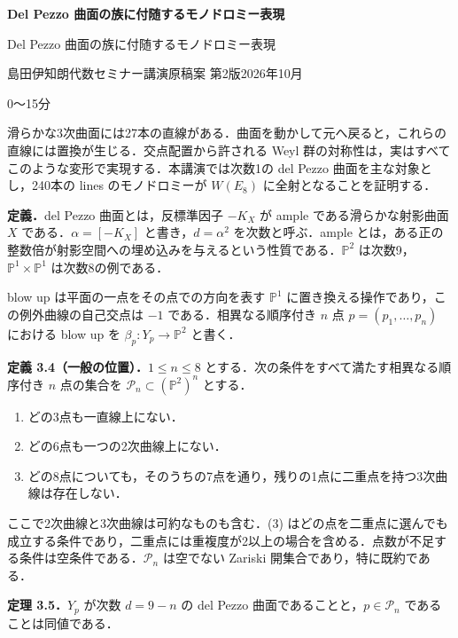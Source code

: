 \documentclass[a4paper,10pt]{ltjsarticle}
\newcommand{\PP}{\mathbb P}
\newcommand{\CC}{\mathbb C}
\newcommand{\Pn}{\mathcal P}
\newcommand{\head}[2]{\par\medskip\noindent{\large\bfseries #1}\hfill{\small #2}\par\medskip}
\begin{document}
\begin{center}
{\Large\bfseries Del Pezzo 曲面の族に付随するモノドロミー表現}\par\smallskip
{\large Del Pezzo 曲面の族に付随するモノドロミー表現}\par\smallskip
島田伊知朗\quad 代数セミナー講演原稿案 第2版\quad 2026年10月
\end{center}
\head{1\quad del Pezzo 曲面と一般の位置}{0〜15分}
滑らかな3次曲面には27本の直線がある．曲面を動かして元へ戻ると，これらの直線には置換が生じる．交点配置から許される Weyl 群の対称性は，実はすべてこのような変形で実現する．本講演では次数1の del Pezzo 曲面を主な対象とし，240本の lines のモノドロミーが $W(E_8)$ に全射となることを証明する．

\noindent\textbf{定義．}\quad del Pezzo 曲面とは，反標準因子 $-K_X$ が ample である滑らかな射影曲面 $X$ である．$\alpha=[-K_X]$ と書き，$d=\alpha^2$ を次数と呼ぶ．ample とは，ある正の整数倍が射影空間への埋め込みを与えるという性質である．$\PP^2$ は次数9，$\PP^1\times\PP^1$ は次数8の例である．

blow up は平面の一点をその点での方向を表す $\PP^1$ に置き換える操作であり，この例外曲線の自己交点は $-1$ である．相異なる順序付き $n$ 点 $p=(p_1,\ldots,p_n)$ における blow up を $\beta_p:Y_p\to\PP^2$ と書く．

\noindent\textbf{定義 3.4（一般の位置）．}\quad $1\leq n\leq8$ とする．次の条件をすべて満たす相異なる順序付き $n$ 点の集合を $\Pn_n\subset(\PP^2)^n$ とする．
\begin{enumerate}
\setlength{\itemsep}{0pt}\setlength{\parskip}{0pt}
\item どの3点も一直線上にない．
\item どの6点も一つの2次曲線上にない．
\item どの8点についても，そのうちの7点を通り，残りの1点に二重点を持つ3次曲線は存在しない．
\end{enumerate}
\noindent ここで2次曲線と3次曲線は可約なものも含む．(3) はどの点を二重点に選んでも成立する条件であり，二重点には重複度が2以上の場合を含める．点数が不足する条件は空条件である．$\Pn_n$ は空でない Zariski 開集合であり，特に既約である．

\noindent\textbf{定理 3.5．}\quad $Y_p$ が次数 $d=9-n$ の del Pezzo 曲面であることと，$p\in\Pn_n$ であることは同値である．
\end{document}
